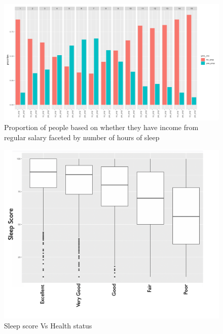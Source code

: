 \documentclass[12pt]{article}
\begin{document}
\begin{figure}[H]
\centering
\includegraphics[scale = 0.4]{sleepIncome.png}
\caption{Proportion of people based on whether they have income from regular salary faceted by number of hours of sleep}
\label{fig:sleepvsincome}
\end{figure}

\begin{figure}[H]
\centering
\includegraphics[scale = 0.4]{sleepHealth.png}
\caption{Sleep score Vs Health status}
\label{fig:sleepvshealth}
\end{figure}
\end{document}
